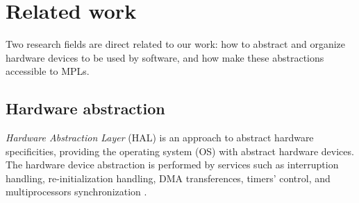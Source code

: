 %
%
% 
%
%
%
%
% 
\section{Related work} \label{sec:relat}
% 
%
Two research fields are direct related to our work: how to abstract and organize
hardware devices to be used by software, and how make these abstractions
accessible to MPLs.
% 

\subsection{Hardware abstraction}
\emph{Hardware Abstraction Layer} (HAL) is an approach to abstract
hardware specificities, providing the operating system (OS)
with abstract hardware devices.
The hardware device abstraction is performed by services such as interruption
handling, re-initialization handling, DMA transferences, timers' control, and
multiprocessors synchronization \cite{Tanenbaum:2007:MOS:1410217}.

